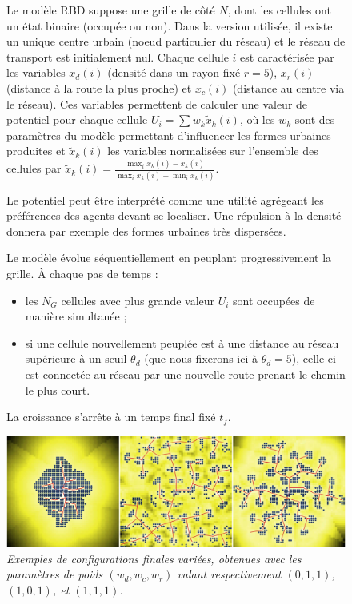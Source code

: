 \begin{figure}[h!]
\begin{mdframed}
Le modèle RBD suppose une grille de côté $N$, dont les cellules ont un état binaire (occupée ou non). Dans la version utilisée, il existe un unique centre urbain (noeud particulier du réseau) et le réseau de transport est initialement nul. Chaque cellule $i$ est caractérisée par les variables $x_d (i)$ (densité dans un rayon fixé $r=5$), $x_r (i)$ (distance à la route la plus proche) et $x_c (i)$ (distance au centre via le réseau). Ces variables permettent de calculer une valeur de potentiel pour chaque cellule $U_i = \sum w_k \tilde{x}_k (i)$, où les $w_k$ sont des paramètres du modèle permettant d'influencer les formes urbaines produites et $\tilde{x}_k(i)$ les variables normalisées sur l'ensemble des cellules par $\tilde{x}_k(i) = \frac{\max_i x_k (i) - x_k (i)}{\max_i x_k (i) - \min_i x_k (i)}$.

Le potentiel peut être interprété comme une utilité agrégeant les préférences des agents devant se localiser. Une répulsion à la densité donnera par exemple des formes urbaines très dispersées.

Le modèle évolue séquentiellement en peuplant progressivement la grille. À chaque pas de temps :
\begin{itemize}
	\item les $N_G$ cellules avec plus grande valeur $U_i$ sont occupées de manière simultanée ;
	\item si une cellule nouvellement peuplée est à une distance au réseau supérieure à un seuil $\theta_d$ (que nous fixerons ici à $\theta_d = 5$), celle-ci est connectée au réseau par une nouvelle route prenant le chemin le plus court.
\end{itemize}

La croissance s'arrête à un temps final fixé $t_f$.

\medskip

\includegraphics[width=\linewidth]{Figures/Final/4-2-2-frame-causalityregimes-rdb.jpg}
\textit{Exemples de configurations finales variées, obtenues avec les paramètres de poids $(w_{d},w_{c},w_{r})$ valant respectivement $(0,1,1)$,$(1,0,1)$, et $(1,1,1)$.}

\medskip

\end{mdframed}
\end{figure}

